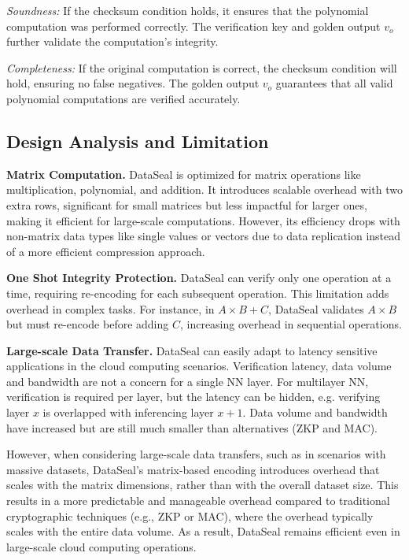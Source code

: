 \textit{Soundness:} If the checksum condition holds, it ensures that the polynomial computation was performed correctly. The verification key and golden output \(v_o\) further validate the computation's integrity.

\textit{Completeness:} If the original computation is correct, the checksum condition will hold, ensuring no false negatives. The golden output \(v_o\) guarantees that all valid polynomial computations are verified accurately.



\subsection{Design Analysis and Limitation}
\label{s:analysis}

\noindent\textbf{Matrix Computation.} 
DataSeal is optimized for matrix operations like multiplication, polynomial, and addition. It introduces scalable overhead with two extra rows, significant for small matrices but less impactful for larger ones, making it efficient for large-scale computations. However, its efficiency drops with non-matrix data types like single values or vectors due to data replication instead of a more efficient compression approach.

\noindent\textbf{One Shot Integrity Protection.} 
DataSeal can verify only one operation at a time, requiring re-encoding for each subsequent operation. This limitation adds overhead in complex tasks. For instance, in \(A \times B + C\), DataSeal validates \(A \times B\) but must re-encode before adding \(C\), increasing overhead in sequential operations.

\noindent\textbf{Large-scale Data Transfer.} 
DataSeal can easily adapt to latency sensitive applications in the cloud computing scenarios.
Verification latency, data volume and bandwidth are not a concern for a single NN layer. For multilayer NN, verification is required per layer, but the latency can be hidden, e.g. verifying layer $x$ is overlapped with inferencing layer $x+1$. Data volume and bandwidth have increased but are still much smaller than alternatives (ZKP and MAC).

However, when considering large-scale data transfers, such as in scenarios with massive datasets, DataSeal's matrix-based encoding introduces overhead that scales with the matrix dimensions, rather than with the overall dataset size. This results in a more predictable and manageable overhead compared to traditional cryptographic techniques (e.g., ZKP or MAC), where the overhead typically scales with the entire data volume. As a result, DataSeal remains efficient even in large-scale cloud computing operations.



